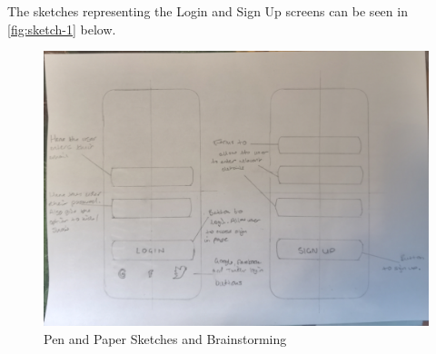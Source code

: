 \documentclass[12pt]{article}
\begin{document}
	The sketches representing the Login and Sign Up screens can be seen in \autoref{fig:sketch-1} below.
	\begin{figure}[H]
		\centering
		\includegraphics[scale=0.2]{images/sketch-1.png}
		\caption{Pen and Paper Sketches and Brainstorming}
		\label{fig:sketch-1}
	\end{figure}
	
	
\end{document}
